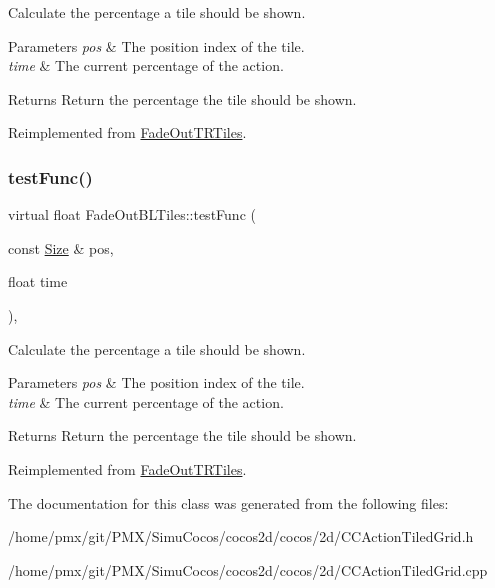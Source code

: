 Calculate the percentage a tile should be shown. 


\begin{DoxyParams}{Parameters}
{\em pos} & The position index of the tile. \\
\hline
{\em time} & The current percentage of the action. \\
\hline
\end{DoxyParams}
\begin{DoxyReturn}{Returns}
Return the percentage the tile should be shown. 
\end{DoxyReturn}


Reimplemented from \hyperlink{classFadeOutTRTiles_aed87971151a43d41b598a8c65f0e7d8f}{Fade\+Out\+T\+R\+Tiles}.

\mbox{\label{classFadeOutBLTiles_a17aa884f96bbdc18e8500bfb5bf68257}} 
\subsubsection{\texorpdfstring{test\+Func()}{testFunc()}\hspace{0.1cm}{\footnotesize\ttfamily [2/2]}}
{\footnotesize\ttfamily virtual float Fade\+Out\+B\+L\+Tiles\+::test\+Func (\begin{DoxyParamCaption}\item[{const \hyperlink{classSize}{Size} \&}]{pos,  }\item[{float}]{time }\end{DoxyParamCaption})\hspace{0.3cm}{\ttfamily [override]}, {\ttfamily [virtual]}}



Calculate the percentage a tile should be shown. 


\begin{DoxyParams}{Parameters}
{\em pos} & The position index of the tile. \\
\hline
{\em time} & The current percentage of the action. \\
\hline
\end{DoxyParams}
\begin{DoxyReturn}{Returns}
Return the percentage the tile should be shown. 
\end{DoxyReturn}


Reimplemented from \hyperlink{classFadeOutTRTiles_aed87971151a43d41b598a8c65f0e7d8f}{Fade\+Out\+T\+R\+Tiles}.



The documentation for this class was generated from the following files\+:\begin{DoxyCompactItemize}
\item 
/home/pmx/git/\+P\+M\+X/\+Simu\+Cocos/cocos2d/cocos/2d/C\+C\+Action\+Tiled\+Grid.\+h\item 
/home/pmx/git/\+P\+M\+X/\+Simu\+Cocos/cocos2d/cocos/2d/C\+C\+Action\+Tiled\+Grid.\+cpp\end{DoxyCompactItemize}
